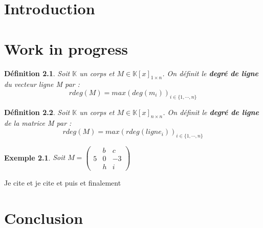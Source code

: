 \documentclass[a4paper,12pt]{report}  %
\theoremstyle{definitionstyle}
\newtheorem{definition}{Définition}[chapter] %
\theoremstyle{examplestyle}
\newtheorem{example}{Exemple}[chapter] %
\begin{document}
\tableofcontents


\chapter{Introduction}

\chapter{Work in progress}

\begin{definition}
Soit $\mathbb{K}$ un corps et $M \in \mathbb{K}[x]_{1 \times n}$. On définit le \textbf{degré de ligne} du vecteur ligne M par : 
$$rdeg(M)=max(deg(m_i))_{i\in\{1, \cdots, n\}}$$
\end{definition}

\begin{definition}
Soit $\mathbb{K}$ un corps et $M \in \mathbb{K}[x]_{n \times n}$. On définit le \textbf{degré de ligne} de la matrice M par :
$$rdeg(M)=max(rdeg(ligne_i))_{i\in\{1, \cdots, n\}}$$
\end{definition}

\begin{example}
Soit $M =
\begin{pmatrix}
 & b & c \\
5 & 0 & -3\\
 & h & i
\end{pmatrix}
$

\end{example}

Je cite \cite{clef_unique_0} et \cite{clef_unique_1}  je cite \cite{clef_unique_2} et puis \cite{clef_unique_3} et finalement \cite{clef_unique_4}

\chapter{Conclusion}


\printbibliography
\end{document}
